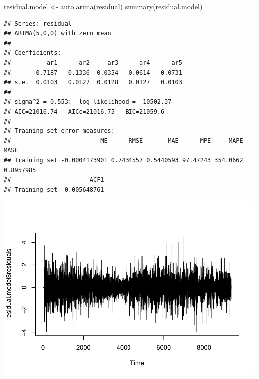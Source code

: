 \documentclass[
]{article}
\newenvironment{Shaded}{\begin{snugshade}}{\end{snugshade}}
\newcommand{\FunctionTok}[1]{\textcolor[rgb]{0.00,0.00,0.00}{#1}}
\newcommand{\NormalTok}[1]{#1}
\newcommand{\OtherTok}[1]{\textcolor[rgb]{0.56,0.35,0.01}{#1}}
\newcommand{\SpecialCharTok}[1]{\textcolor[rgb]{0.00,0.00,0.00}{#1}}
\begin{document}
\begin{Shaded}
\begin{Highlighting}[]
\NormalTok{residual.model }\OtherTok{\textless{}{-}} \FunctionTok{auto.arima}\NormalTok{(residual)}
\FunctionTok{summary}\NormalTok{(residual.model)}
\end{Highlighting}
\end{Shaded}

\begin{verbatim}
## Series: residual 
## ARIMA(5,0,0) with zero mean 
## 
## Coefficients:
##          ar1      ar2     ar3      ar4      ar5
##       0.7187  -0.1336  0.0354  -0.0614  -0.0731
## s.e.  0.0103   0.0127  0.0128   0.0127   0.0103
## 
## sigma^2 = 0.553:  log likelihood = -10502.37
## AIC=21016.74   AICc=21016.75   BIC=21059.6
## 
## Training set error measures:
##                         ME      RMSE       MAE      MPE     MAPE      MASE
## Training set -0.0004173901 0.7434557 0.5440593 97.47243 354.0662 0.8957985
##                      ACF1
## Training set -0.005648761
\end{verbatim}

\begin{Shaded}
\end{Shaded}

\includegraphics{STA202_report_files/figure-latex/unnamed-chunk-11-18.pdf}

\begin{Shaded}
\end{Shaded}
\end{document}
